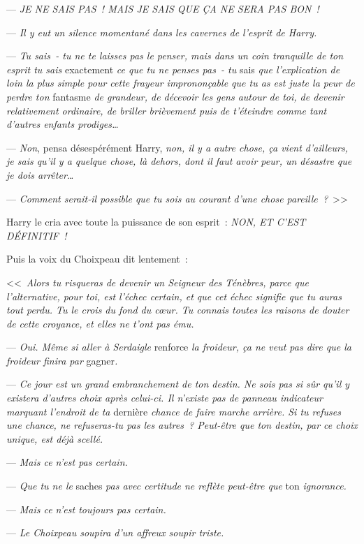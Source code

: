 --- \emph{JE NE SAIS PAS~! MAIS JE SAIS QUE ÇA NE SERA PAS BON~!}

--- \emph{Il y eut un silence momentané dans les cavernes de l'esprit de Harry.}

--- \emph{Tu sais~- tu ne te laisses pas le penser, mais dans un coin tranquille de ton esprit tu sais} exactement \emph{ce que tu ne penses pas~- tu} sais \emph{que l'explication de loin la plus simple pour cette frayeur imprononçable que tu as est juste la peur de perdre ton} fantasme \emph{de grandeur, de décevoir les gens autour de toi, de devenir relativement ordinaire, de briller brièvement puis de t'éteindre comme tant d'autres enfants prodiges…}

--- \emph{Non}, pensa désespérément Harry, \emph{non, il y a autre chose, ça vient d'ailleurs, je sais qu'il y a quelque chose, là dehors, dont il faut avoir peur, un désastre que je dois arrêter…}

--- \emph{Comment serait-il possible que tu sois au courant d'une chose pareille~?}~>>

Harry le cria avec toute la puissance de son esprit~: \emph{NON, ET C'EST DÉFINITIF~!}

Puis la voix du Choixpeau dit lentement~:

<<~\emph{Alors tu risqueras de devenir un Seigneur des Ténèbres, parce que l'alternative, pour toi, est l'échec certain, et que cet échec signifie que tu auras tout perdu. Tu le crois du fond du cœur. Tu connais toutes les raisons de douter de cette croyance, et elles ne t'ont pas ému.}

--- \emph{Oui. Même si aller à Serdaigle} renforce \emph{la froideur, ça ne veut pas dire que la froideur finira par} gagner\emph{.}

--- \emph{Ce jour est un grand embranchement de ton destin. Ne sois pas si sûr qu'il y existera d'autres choix après celui-ci. Il n'existe pas de panneau indicateur marquant l'endroit de ta} dernière \emph{chance de faire marche arrière. Si tu refuses une chance, ne refuseras-tu pas les autres~? Peut-être que ton destin, par ce choix unique, est déjà scellé.}

--- \emph{Mais ce n'est pas certain.}

--- \emph{Que tu ne le} saches \emph{pas avec certitude ne reflète peut-être que} ton \emph{ignorance.}

--- \emph{Mais ce n'est toujours pas certain.}

--- \emph{Le Choixpeau soupira d'un affreux soupir triste.}

